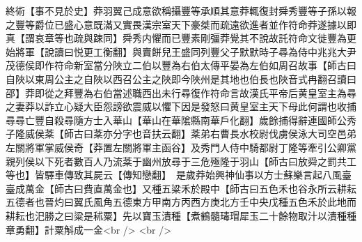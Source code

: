 終術【事不見於史】莽羽翼己成意欲稱攝豐等承順其意莽輒復封舜秀豐等子孫以報之豐等爵位已盛心意既滿又實畏漢宗室天下豪桀而疏遠欲進者並作符命莽遂據以即真【謂哀章等也疏與踈同】舜秀内懼而已豐素剛彊莽覺其不說故託符命文徙豐為更始將軍【說讀曰悦更工衡翻】與賣餅兒王盛同列豐父子默默時子尋為侍中兆兆大尹茂德侯即作符命新室當分陜立二伯以豐為右伯太傳平晏為左伯如周召故事【師古曰自陜以東周公主之自陜以西召公主之陜即今陜州是其地也伯長也陜音式冉翻召讀曰邵】莽即從之拜豐為右伯當述職西出未行尋復作符命言故漢氏平帝后黄皇室主為尋之妻莽以詐立心疑大臣怨謗欲震威以懼下因是發怒曰黄皇室主天下母此何謂也收捕尋尋亡豐自殺尋隨方士入華山【華山在華隂縣南華戶化翻】歲餘捕得辭連國師公秀子隆威侯棻【師古曰棻亦分字也音扶云翻】棻弟右曹長水校尉伐虜侯泳大司空邑弟左關將軍掌威侯奇【莽置左關將軍主函谷】及秀門人侍中騎都尉丁隆等牽引公卿黨親列侯以下死者數百人乃流棻于幽州放尋于三危殛隆于羽山【師古曰放舜之罰共工等也】皆驛車傳致其屍云【傳知戀翻】　是歲莽始興神仙事以方士蘇樂言起八風臺臺成萬金【師古曰費直萬金也】又種五粱禾於殿中【師古曰五色禾也谷永所云耕耘五德者也晉灼曰翼氏風角五德東方甲南方丙西方庚北方壬中央戊種五色禾於此地而耕耘也汜勝之曰粱是秫粟】先以寶玉漬種【煮鶴髓瑇瑁犀玉二十餘物取汁以漬種種章勇翻】計粟斛成一金<br />
<br />
